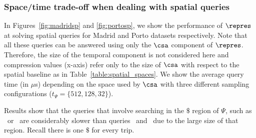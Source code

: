 

\subsubsection{Space/time trade-off when dealing with spatial queries} \label{sec:exp:temp}

In Figures~\ref{fig:madridsp} and \ref{fig:portosp}, we show the performance of $\repres$ at
solving spatial queries for Madrid and Porto datasets respectively. 
Note that all these queries can be answered using only the $\csa$ component
of $\repres$. Therefore, the size of the temporal component 
is not considered here and compression values (x-axis) refer only to the size of $\csa$ with
respect to the spatial baseline as in Table~\ref{table:spatial_spaces}. 
We show the average query time (in $\mu$s) depending on the
space used by $\csa$ with three different 
sampling configurations ($t_{\Psi} =\{512, 128, 32\}$).


Results show that the queries that involve searching in the $\$$ region of 
$\Psi$, such as \Sswx\ or \Sfxty\ are considerably slower than queries \Sewx\ and \Sux\ 
due to the large size of that region. Recall there is one $\$$ for every trip. 
%



